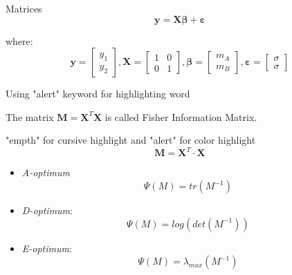 \documentclass{beamer}
\begin{document}
\begin{frame} {Matrices}
    \begin{equation*}
        \mathbf{y}=\mathbf{X} \mathbf{\beta} + \mathbf{\varepsilon}
    \end{equation*}
    
    where:
    \begin{equation*}
        \mathbf{y} = \left[\begin{matrix} y_1 \\ y_2 \end{matrix}\right], 
        \mathbf{X} = \left[\begin{matrix} 1 & 0 \\ 0 & 1 \end{matrix} \right],
        \mathbf{\beta} = \left[\begin{matrix} m_A \\ m_B \end{matrix}\right], 
        \mathbf{\varepsilon} = \left[\begin{matrix} \sigma \\ \sigma \end{matrix}\right]
    \end{equation*}
    
\end{frame}


\begin{frame} {Using "alert" keyword for highlighting word}
   
The matrix \alert{$\mathbf{M}=\mathbf{X}^T\mathbf{X}$} is called \alert{Fisher Information Matrix}.

\end{frame}


\begin{frame}{"empth" for cursive highlight and "alert" for color highlight}
$$ \mathbf{M} = \mathbf{X}^T \cdot \mathbf{X} $$
  \begin{itemize}
      \item \alert{\emph{A-optimum} $$\Psi(M) = tr(M^{-1})$$}
      
      \item \emph{D-optimum}:  $$\Psi(M) =  log(det(M^{-1}))$$
      
      \item \emph{E-optimum}: $$\Psi(M) = \lambda_{max}(M^{-1})$$
      
  \end{itemize}
\end{frame}
\end{document}
